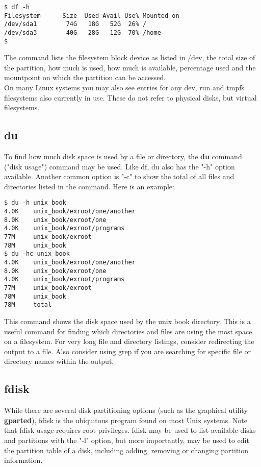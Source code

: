 \begin{verbatim}
$ df -h
Filesystem      Size  Used Avail Use% Mounted on
/dev/sda1        74G   18G   52G  26% /
/dev/sda3        40G   28G   12G  70% /home
$
\end{verbatim}

The command lists the filesystem block device as listed in /dev, the total size of the partition, how much is used, how much is available, percentage used and the mountpoint on which the partition can be accessed.\\

On many Linux systems you may also see entries for any dev, run and tmpfs filesystems also currently in use.  These do not refer to physical disks, but virtual filesystems.

\subsection{du}

To find how much disk space is used by a file or directory, the \textbf{du} command ("disk usage") command may be used.  Like df, du also has the "-h" option available.  Another common option is "-c" to show the total of all files and directories listed in the command.  Here is an example:

\begin{verbatim}
$ du -h unix_book
4.0K    unix_book/exroot/one/another
8.0K    unix_book/exroot/one
4.0K    unix_book/exroot/programs
77M     unix_book/exroot
78M     unix_book
$ du -hc unix_book
4.0K    unix_book/exroot/one/another
8.0K    unix_book/exroot/one
4.0K    unix_book/exroot/programs
77M     unix_book/exroot
78M     unix_book
78M     total
\end{verbatim}

This command shows the disk space used by the unix book directory.  This is a useful command for finding which directories and files are using the most space on a filesystem.  For very long file and directory listings, consider redirecting the output to a file.  Also consider using grep if you are searching for specific file or directory names within the output.

\subsection{fdisk}

While there are several disk partitioning options (such as the graphical utility \textbf{gparted}), fdisk is the ubiquitous program found on most Unix systems.  Note that fdisk usage requires root privileges.  fdisk may be used to list available disks and partitions with the "-l" option, but more importantly, may be used to edit the partition table of a disk, including adding, removing or changing partition information.\\

